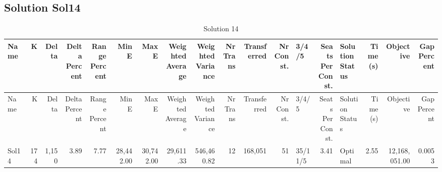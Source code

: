 \documentclass[a4paper]{article}
\begin{document}
\clearpage
\subsection{Solution Sol14}

{\scriptsize
\begin{longtable}{lrrrrrrrrrrrlrlrrr}
\caption{Solution 14}
\\ \toprule
Name &K &Delta &\shortstack{Delta\\Percent} &\shortstack{Range\\Percent} &Min E &Max E &\shortstack{Weighted\\Average} &\shortstack{Weighted\\Variance} &\shortstack{Nr\\Trans} &Transferred &\shortstack{Nr\\Const.} &3/4/5 &\shortstack{Seats\\Per\\Const.} &\shortstack{Solution\\Status} &\shortstack{Time\\(s)} &Objective &\shortstack{Gap\\Percent} \\ \midrule
\endfirsthead
\toprule
Name &K &Delta &\shortstack{Delta\\Percent} &\shortstack{Range\\Percent} &Min E &Max E &\shortstack{Weighted\\Average} &\shortstack{Weighted\\Variance} &\shortstack{Nr\\Trans} &Transferred &\shortstack{Nr\\Const.} &3/4/5 &\shortstack{Seats\\Per\\Const.} &\shortstack{Solution\\Status} &\shortstack{Time\\(s)} &Objective &\shortstack{Gap\\Percent} \\ \midrule
\endhead
\bottomrule
\endfoot
Sol14&174&1,150& 3.89& 7.77&28,442.00&30,742.00&29,611.33&546,460.82&12&168,051&51&35/11/5& 3.41&Optimal& 2.55&12,168,051.00&0.0053\\ 
\end{longtable}

}
\end{document}
